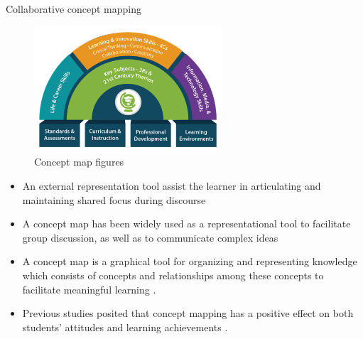 \begin{frame}[allowframebreaks]{Collaborative concept mapping}

    \begin{figure}[tb]
        \begin{center}
            \includegraphics[width=70mm]{images/p21centuryskills.png}
        \end{center}
        \caption{Concept map figures}
        \label{intro::conceptmap}
    \end{figure}
    
    \begin{itemize}
        \item An external representation tool assist the learner in articulating 
        and maintaining shared focus during discourse \cite{Fischer2002FosteringTools,Suthers2006TechnologyCSCL,vanBoxtel2002CollaborativeDiscourse}
        \item A concept map has been widely used as a representational tool to facilitate group
        discussion, as well as to communicate complex ideas 
        \cite{Fischer2002FosteringTools,Gracia-Moreno2017CollaborativeWorkspaces,Suthers2006TechnologyCSCL,vanBoxtel2000CollaborativeKnowledge}
        \item A concept map is a graphical tool for organizing and representing knowledge which consists of concepts and relationships among these concepts to facilitate meaningful learning \cite{novak1984learning}.
        \item Previous studies posited that concept mapping has a positive effect on both students’ attitudes and learning achievements \cite{Basque2006CollaborativeTrends,Czerniak1998TheScience}.
    \end{itemize}
\end{frame}

